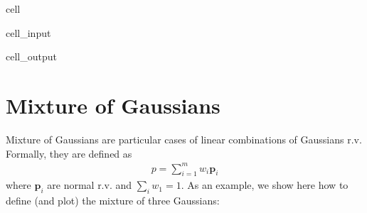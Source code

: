 \documentclass[letterpaper,10pt,english]{jupyterBook}
\begin{document}
\begin{sphinxuseclass}{cell}
\begin{sphinxVerbatimInput}
\begin{sphinxuseclass}{cell_input}
\begin{sphinxVerbatim}[commandchars=\\\{\}]
       \PYG{p}{[}\PYG{p}{]}
\end{sphinxVerbatim}

\end{sphinxuseclass}\end{sphinxVerbatimInput}
\begin{sphinxVerbatimOutput}

\begin{sphinxuseclass}{cell_output}
\noindent{}

\end{sphinxuseclass}\end{sphinxVerbatimOutput}

\end{sphinxuseclass}

\section{Mixture of Gaussians}
\label{\detokenize{01:mixture-of-gaussians}}
\sphinxAtStartPar
Mixture of Gaussians are particular cases of linear combinations of Gaussians r.v. Formally, they are defined as
\begin{equation*}
\begin{split}p = \sum_{i=1}^m w_i \mathbf p_i\end{split}
\end{equation*}
\sphinxAtStartPar
where \(\mathbf p_i\) are normal r.v. and \(\sum_i w_1=1\).
As an example, we show here how to define (and plot) the mixture of three Gaussians:
\end{document}
